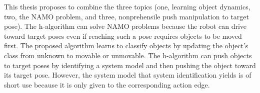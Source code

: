 This thesis proposes to combine the three topics (one, learning object dynamics, two, the \ac{NAMO} problem, and three, nonprehensile push manipulation to target pose). The \ac{h-algorithm} can solve \ac{NAMO} problems because the robot can drive toward target poses even if reaching such a pose requires objects to be moved first. The proposed algorithm learns to classify objects by updating the object's class from unknown to movable or unmovable. The \ac{h-algorithm} can push objects to target poses by identifying a system model and then pushing the object toward its target pose. However, the system model that system identification yields is of short use because it is only given to the corresponding action edge.\bs

